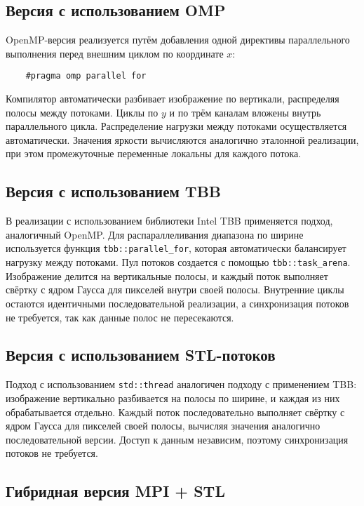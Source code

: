 \documentclass[12pt]{article}
\begin{document}
\subsection{Версия с использованием OMP}

OpenMP-версия реализуется путём добавления одной директивы параллельного выполнения перед внешним циклом по координате \(x\):
\begin{verbatim}
	#pragma omp parallel for
\end{verbatim}

Компилятор автоматически разбивает изображение по вертикали, распределяя полосы между потоками. Циклы по \(y\) и по трём каналам вложены внутрь параллельного цикла. Распределение нагрузки между потоками осуществляется автоматически. Значения яркости вычисляются аналогично эталонной реализации, при этом промежуточные переменные локальны для каждого потока.


\subsection{Версия с использованием TBB}

В реализации с использованием библиотеки Intel TBB применяется подход, аналогичный OpenMP. Для распараллеливания диапазона по ширине используется функция \texttt{tbb::parallel\_for}, которая автоматически балансирует нагрузку между потоками. Пул потоков создается с помощью \texttt{tbb::task\_arena}. Изображение делится на вертикальные полосы, и каждый поток выполняет свёртку с ядром Гаусса для пикселей внутри своей полосы. Внутренние циклы остаются идентичными последовательной реализации, а синхронизация потоков не требуется, так как данные полос не пересекаются.

\subsection{Версия с использованием STL-потоков}

Подход с использованием \texttt{std::thread} аналогичен подходу с применением TBB: изображение вертикально разбивается на полосы по ширине, и каждая из них обрабатывается отдельно. Каждый поток последовательно выполняет свёртку с ядром Гаусса для пикселей своей полосы, вычисляя значения аналогично последовательной версии. Доступ к данным независим, поэтому синхронизация потоков не требуется.

\subsection{Гибридная версия MPI + STL}
\end{document}
